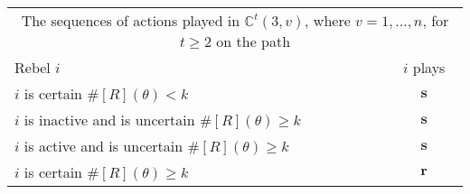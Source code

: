 \documentclass[12pt,letter]{article}
\newcommand{\Kappa}{\mathbb{C}}
\theoremstyle{definition}
\theoremstyle{definition}
\theoremstyle{remark}
\theoremstyle{claim}
\begin{document}
\begin{table}[!htbp]
\begin{center}
\begin{tabular}{l c}
\multicolumn{2}{c}{The sequences of actions played in $\Kappa^t(3,v)$, where $v=1,...,n$, for $t\geq 2$ on the path}\\
Rebel $i$ 	 	&  	$i$ plays		 \\
\hline
\hline
$i$ is certain $\#[R](\theta)<k$ 	& 	$\textbf{s}$	\\
$i$ is inactive and is uncertain $\#[R](\theta)\geq k$	& 	$ \textbf{s} $	\\
$i$ is active and is uncertain $\#[R](\theta)\geq k$ &  $ \textbf{s} $  \\
$i$ is certain $\#[R](\theta)\geq k$ &  $ \textbf{r} $  \\
\hline
\end{tabular}
\end{center}
\end{table}
\end{document}
